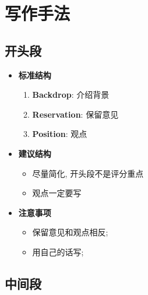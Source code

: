 \section{写作手法}

  \subsection{开头段}

    \begin{itemize}
      \item \textbf{标准结构}
      \begin{enumerate}
        \item \textbf{Backdrop}: 介绍背景
        \item \textbf{Reservation}: 保留意见
        \item \textbf{Position}: 观点
      \end{enumerate}

      \item \textbf{建议结构}
      \begin{itemize}
        \item 尽量简化, 开头段不是评分重点
        \item 观点一定要写
      \end{itemize}

      \item \textbf{注意事项}
      \begin{itemize}
        \item 保留意见和观点相反;
        \item 用自己的话写;
      \end{itemize}
    \end{itemize}

  \subsection{中间段}

